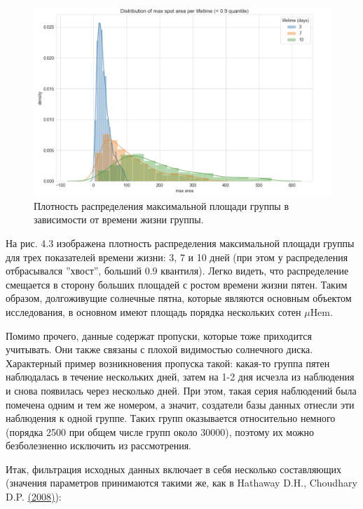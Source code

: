 \documentclass[a4paper, 12pt]{article}
\newcommand{\bibref}[3]{#2 \hyperlink{#1}{\color{blue}(#3)}}
\begin{document}
\begin{figure}[H]
    \centering
    \includegraphics[width=17cm]{max_area_distr.png}
    \caption{Плотность распределения максимальной площади группы в зависимости от времени жизни группы.}
    \label{fig:my_label}
\end{figure}{}

На рис. 4.3 изображена плотность распределения максимальной площади группы для трех показателей времени жизни: 3, 7 и 10 дней (при этом у распределения отбрасывался ''хвост'', больший 0.9 квантиля). Легко видеть, что распределение смещается в сторону больших площадей с ростом времени жизни пятен. Таким образом, долгоживущие солнечные пятна, которые являются основным объектом исследования, в основном имеют площадь порядка нескольких сотен $\mu$Hem.

Помимо прочего, данные содержат пропуски, которые тоже приходится учитывать. Они также связаны с плохой видимостью солнечного диска. Характерный пример возникновения пропуска такой: какая-то группа пятен наблюдалась в течение нескольких дней, затем на 1-2 дня исчезла из наблюдения и снова появилась через несколько дней. При этом, такая серия наблюдений была помечена одним и тем же номером, а значит, создатели базы данных отнесли эти наблюдения к одной группе. Таких групп оказывается относительно немного (порядка 2500 при общем числе групп около 30000), поэтому их можно безболезненно исключить из рассмотрения.

Итак, фильтрация исходных данных включает в себя несколько составляющих (значения параметров принимаются такими же, как в \bibref{hathaway}{Hathaway D.H., Choudhary D.P.}{2008}):
\end{document}
